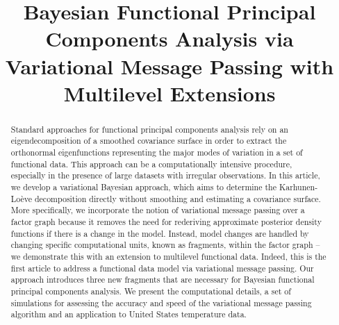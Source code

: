 \documentclass[ba]{imsart}
\numberwithin{equation}{section}
\theoremstyle{plain}
\begin{document}
\begin{frontmatter}
\title{Bayesian Functional Principal Components Analysis via Variational Message Passing with Multilevel Extensions}


\begin{abstract}
Standard approaches for functional principal components analysis
rely on an eigendecomposition of a smoothed covariance surface in order to extract the orthonormal eigenfunctions
representing the major modes of variation in a set of functional data.
This approach can be a computationally intensive procedure, especially
in the presence of large datasets with irregular observations. In this article, we develop a variational Bayesian approach,
which aims to determine the Karhunen-Lo\`{e}ve decomposition directly without smoothing and estimating a
covariance surface. More specifically, we incorporate the notion of variational message passing over a factor graph 
because it removes the need for rederiving approximate
posterior density functions if there is a change in the model. Instead, model changes are handled by changing
specific computational units, known as fragments, within the factor graph -- we demonstrate this with an extension
to multilevel functional data. 
Indeed, this is the first article to address a functional data model
via variational message passing. Our approach introduces three new fragments that are necessary for Bayesian
functional principal components analysis. We present the computational details, a set of simulations for assessing the
accuracy and speed of the variational message passing algorithm and an application to United States temperature data.
\end{abstract}


\end{frontmatter}
\end{document}
